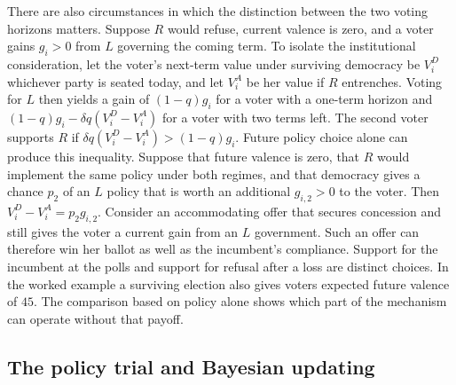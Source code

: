 \documentclass[11pt,letterpaper]{article}
\begin{document}
There are also circumstances in which the distinction between the two voting horizons matters. Suppose $R$ would refuse, current valence is zero, and a voter gains $g_i>0$ from $L$ governing the coming term. To isolate the institutional consideration, let the voter's next-term value under surviving democracy be $V_i^D$ whichever party is seated today, and let $V_i^A$ be her value if $R$ entrenches. Voting for $L$ then yields a gain of $(1-q)g_i$ for a voter with a one-term horizon and $(1-q)g_i-\delta q(V_i^D-V_i^A)$ for a voter with two terms left. The second voter supports $R$ if $\delta q(V_i^D-V_i^A)>(1-q)g_i$. Future policy choice alone can produce this inequality. Suppose that future valence is zero, that $R$ would implement the same policy under both regimes, and that democracy gives a chance $p_2$ of an $L$ policy that is worth an additional $g_{i,2}>0$ to the voter. Then $V_i^D-V_i^A=p_2g_{i,2}$. Consider an accommodating offer that secures concession and still gives the voter a current gain from an $L$ government. Such an offer can therefore win her ballot as well as the incumbent's compliance. Support for the incumbent at the polls and support for refusal after a loss are distinct choices. In the worked example a surviving election also gives voters expected future valence of $45$. The comparison based on policy alone shows which part of the mechanism can operate without that payoff.

\subsection{The policy trial and Bayesian updating}
\end{document}
